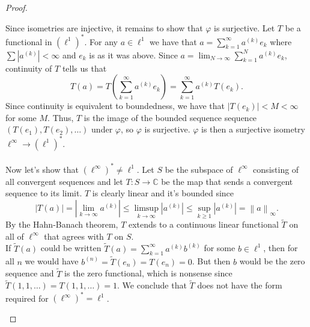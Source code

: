 \documentclass[11pt,letterpaper]{report}
\newcommand{\complex}{\mathbb{C}}
\newcommand{\pnorm}[2]{\left\|{#1}\right\|_{{#2}}}
\begin{document}
\begin{proof}
\begin{enumerate}[(i)]
		Since isometries are injective, it remains to show that $\varphi$ is surjective. Let $T$ be a functional in $(\ell^1)^*$. For any $a\in \ell^1$ we have that $a= \sum_{k=1}^\infty a^{(k)}e_k$ where $\sum |a^{(k)}|<\infty$ and $e_k$ is as it was above. Since $a = \lim_{N\to \infty}\sum_{k=1}^Na^{(k)}e_k$, continuity of $T$ tells us that
		\[
		T(a) = T\left(\sum_{k=1}^\infty a^{(k)}e_k\right) = \sum_{k=1}^\infty a^{(k)}T(e_k).
		\]
		Since continuity is equivalent to boundedness, we have that $|T(e_k)| <M<\infty$ for some $M$. Thus, $T$ is the image of the bounded sequence sequence $(T(e_1), T(e_2), \ldots )$ under $\varphi$, so $\varphi$ is surjective. $\varphi$ is then a surjective isometry $\ell^\infty \to (\ell^1)^*$.\\\\
		Now let's show that $(\ell^\infty)^* \neq \ell^1$. Let $S$ be the subspace of $\ell^\infty$ consisting of all convergent sequences and let $T:S\to \complex$ be the map that sends a convergent sequence to its limit. $T$ is clearly linear and it's bounded since
		\[
		|T(a)| = |\lim_{k\to \infty} a^{(k)}| \leq \limsup_{k\to \infty}|a^{(k)}| \leq \sup_{k\geq 1}|a^{(k)}| = \pnorm{a}{\infty}.
		\]
		By the Hahn-Banach theorem, $T$ extends to a continuous linear functional $\tilde{T}$ on all of $\ell^\infty$ that agrees with $T$ on $S$.\\
		If $\tilde{T}(a)$ could be written $\tilde{T}(a) = \sum_{k=1}^\infty a^{(k)}b^{(k)}$ for some $b\in \ell^1$, then for all $n$ we would have $b^{(n)} = \tilde{T}(e_n) = T(e_n) = 0$. But then $b$ would be the zero sequence and $\tilde{T}$ is the zero functional, which is nonsense since $\tilde{T}(1, 1, \ldots) = T(1, 1, \ldots) = 1$. We conclude that $\tilde{T}$ does not have the form required for $(\ell^\infty)^* = \ell^1$.
	\end{enumerate}
\end{proof}
\end{document}
